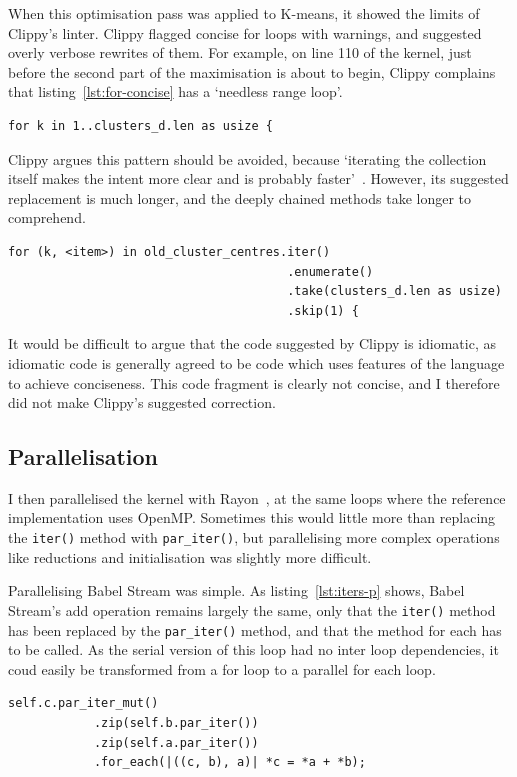 When this optimisation pass was applied to K-means, it showed the limits of Clippy's linter. Clippy flagged concise for loops with warnings, and suggested overly verbose rewrites of them. For example, on line 110 of the kernel, just before the second part of the maximisation is about to begin, Clippy complains that listing~\ref{lst:for-concise} has a `needless range loop'.

\begin{code}
\begin{verbatim}
for k in 1..clusters_d.len as usize {
\end{verbatim}
\label{lst:for-concise}
\end{code}
Clippy argues this pattern should be avoided, because `iterating the collection itself makes the intent more clear and is probably faster'~\cite{ClippyLoop}. However, its suggested replacement is much longer, and the deeply chained methods take longer to comprehend.
\begin{code}
\begin{verbatim}
for (k, <item>) in old_cluster_centres.iter()
                                       .enumerate()
                                       .take(clusters_d.len as usize)
                                       .skip(1) {
\end{verbatim}
\end{code}
It would be difficult to argue that the code suggested by Clippy is idiomatic, as idiomatic code is generally agreed to be code which uses features of the language to achieve conciseness. This code fragment is clearly not concise, and I therefore did not make Clippy's suggested correction.
\subsection{Parallelisation}
I then parallelised the kernel with Rayon~\cite{RustRayon}, at the same loops where the reference implementation uses OpenMP\@. Sometimes this would little more than replacing the \texttt{iter()} method with \texttt{par\_iter()}, but parallelising more complex operations like reductions and initialisation was slightly more difficult.

Parallelising Babel Stream was simple. As listing~\ref{lst:iters-p} shows, Babel Stream's add operation remains largely the same, only that the \texttt{iter()} method has been replaced by the \texttt{par\_iter()} method, and that the method for each has to be called. As the serial version of this loop had no inter loop dependencies, it coud easily be transformed from a for loop to a parallel for each loop.
\begin{code}
\begin{verbatim}
self.c.par_iter_mut()
            .zip(self.b.par_iter())
            .zip(self.a.par_iter())
            .for_each(|((c, b), a)| *c = *a + *b);
\end{verbatim}
\label{lst:iters-p}
\end{code}

